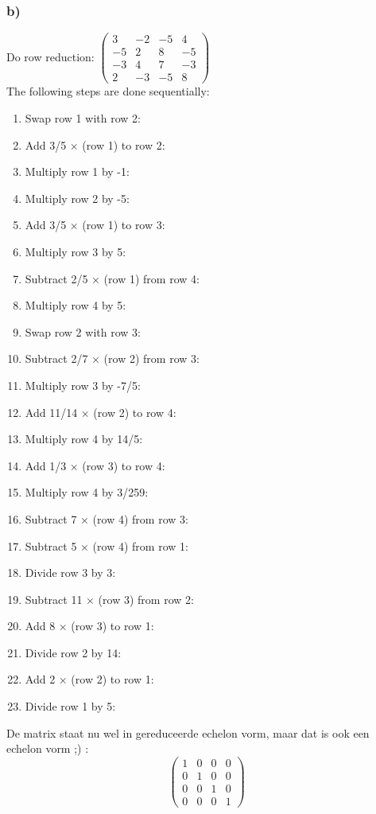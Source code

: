\documentclass[10pt,a4paper]{article}
\begin{document}
\subsubsection*{b)}
Do row reduction:
$
\begin{pmatrix}
3 & -2 & -5 & 4\\
-5 & 2 & 8 & -5\\
-3 & 4 & 7 & -3\\
2 & -3 & -5 & 8
\end{pmatrix}
$
\\
The following steps are done sequentially:
\begin{enumerate}
\item Swap row 1 with row 2:
\item Add 3/5 × (row 1) to row 2:
\item Multiply row 1 by -1:
\item Multiply row 2 by -5:
\item Add 3/5 × (row 1) to row 3:
\item Multiply row 3 by 5:
\item Subtract 2/5 × (row 1) from row 4:
\item Multiply row 4 by 5:
\item Swap row 2 with row 3:
\item Subtract 2/7 × (row 2) from row 3:
\item Multiply row 3 by -7/5:
\item Add 11/14 × (row 2) to row 4:
\item Multiply row 4 by 14/5:
\item Add 1/3 × (row 3) to row 4:
\item Multiply row 4 by 3/259:
\item Subtract 7 × (row 4) from row 3:
\item Subtract 5 × (row 4) from row 1:
\item Divide row 3 by 3:
\item Subtract 11 × (row 3) from row 2:
\item Add 8 × (row 3) to row 1:
\item Divide row 2 by 14:
\item Add 2 × (row 2) to row 1:
\item Divide row 1 by 5:
\end{enumerate}
De matrix staat nu wel in gereduceerde echelon vorm, maar dat is ook een echelon vorm ;) :
\\
\[
\begin{pmatrix}
1 & 0 & 0 & 0\\
0 & 1 & 0 & 0\\
0 & 0 & 1 & 0\\
0 & 0 & 0 & 1
\end{pmatrix}
\]
\end{document}
